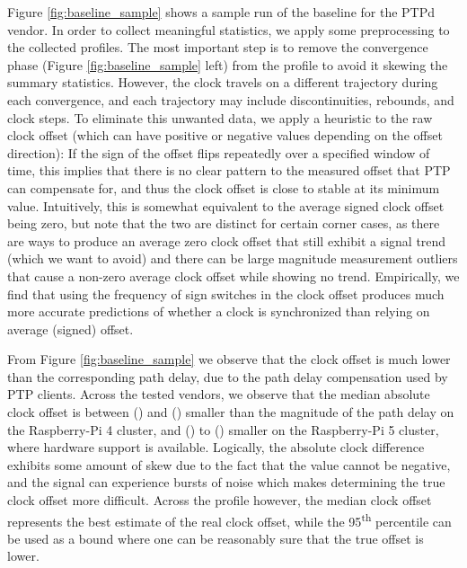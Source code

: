 Figure \ref{fig:baseline_sample} shows a sample run of the baseline for the PTPd vendor. In order to collect meaningful statistics, we apply some preprocessing to the collected profiles. The most important step is to remove the convergence phase (Figure \ref{fig:baseline_sample} left) from the profile to avoid it skewing the summary statistics. However, the clock travels on a different trajectory during each convergence, and each trajectory may include discontinuities, rebounds, and clock steps. To eliminate this unwanted data, we apply a heuristic to the raw clock offset (which can have positive or negative values depending on the offset direction): If the sign of the offset flips repeatedly over a specified window of time, this implies that there is no clear pattern to the measured offset that PTP can compensate for, and thus the clock offset is close to stable at its minimum value. Intuitively, this is somewhat equivalent to the average signed clock offset being zero, but note that the two are distinct for certain corner cases, as there are ways to produce an average zero clock offset that still exhibit a signal trend (which we want to avoid) and there can be large magnitude measurement outliers that cause a non-zero average clock offset while showing no trend. Empirically, we find that using the frequency of sign switches in the clock offset produces much more accurate predictions of whether a clock is synchronized than relying on average (signed) offset.

From Figure \ref{fig:baseline_sample} we observe that the clock offset is much lower than the corresponding path delay, due to the path delay compensation used by PTP clients. Across the tested vendors, we observe that the median absolute clock offset is between \fRatio{\cmpMin} (\fVendor{\cmpMinArg}) and \fRatio{\cmpMax} (\fVendor{\cmpMaxArg}) smaller than the magnitude of the path delay on the Raspberry-Pi 4 cluster,%
%
and \fRatio[-1]{\cmpMin} (\fVendor{\cmpMinArg}) to \fRatio[-1]{\cmpMax} (\fVendor{\cmpMaxArg}) smaller on the Raspberry-Pi 5 cluster, where hardware support is available.
Logically, the absolute clock difference exhibits some amount of skew due to the fact that the value cannot be negative, and the signal can experience bursts of noise which makes determining the true clock offset more difficult. Across the profile however, the median clock offset represents the best estimate of the real clock offset, while the 95\textsuperscript{th} percentile can be used as a bound where one can be reasonably sure that the true offset is lower.

